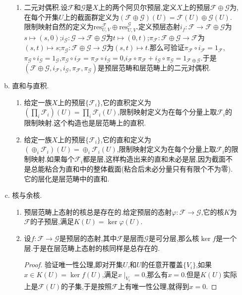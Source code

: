 \begin{enumerate}
\begin{enumerate}[(a)]
\begin{enumerate}[(1)]
			\item 二元对偶积.设$\mathscr{F}$和$\mathscr{G}$是$X$上的两个阿贝尔预层,定义$X$上的预层$\mathscr{F}\oplus\mathscr{G}$为,在每个开集$U$上的截面群定义为$(\mathscr{F}\oplus\mathscr{G})(U)=\mathscr{F}(U)\oplus\mathscr{G}(U)$.限制映射自然的定义为$\mathrm{res}_{U,V}^\mathscr{F}\oplus\mathrm{res}_{U,V}^\mathscr{G}$.定义预层态射$i_f:\mathscr{F}\to \mathscr{F}\oplus\mathscr{G}$为$s\mapsto(s,0)$;$i_{\mathscr{G}}:\mathscr{G}\to\mathscr{F}\oplus\mathscr{G}$为$t\mapsto(0,t)$;$\pi_\mathscr{F}:\mathscr{F}\oplus\mathscr{G}\to\mathscr{F}$为$(s,t)\mapsto s$;$\pi_\mathscr{G}:\mathscr{F}\oplus\mathscr{G}\to\mathscr{G}$为$(s,t)\mapsto t$.那么可验证$\pi_\mathscr{F}\circ i_\mathscr{F}=1_\mathscr{F}$,$\pi_\mathscr{G}\circ i_\mathscr{G}=1_\mathscr{G}$,$\pi_\mathscr{G}\circ i_\mathscr{F}=\pi_\mathscr{F}\circ i_\mathscr{G}=0$,$i_\mathscr{F}\circ\pi_\mathscr{F}+i_\mathscr{G}\circ\pi_\mathscr{G}=1_{\mathscr{F}\oplus\mathscr{G}}$.于是$(\mathscr{F}\oplus\mathscr{G},i_\mathscr{F},i_\mathscr{G},\pi_\mathscr{F},\pi_\mathscr{G})$是预层范畴和层范畴上的二元对偶积.
		\end{enumerate}
		\item 直和与直积.
		\begin{enumerate}[(1)]
			\item 给定一族$X$上的预层$\{\mathscr{F}_i\}$,它的直积定义为$(\prod_i\mathscr{F}_i)(U)=\prod_i\mathscr{F}_i(U)$,限制映射定义为在每个分量上取$\mathscr{F}_i$的限制映射.这个构造也是层范畴上的直积.
			\item 给定一族$X$上的预层$\{\mathscr{F}_i\}$,它的直和定义为$(\oplus_i\mathscr{F}_i)(U)=\oplus_i\mathscr{F}_i(U)$,限制映射定义为在每个分量上取$\mathscr{F}_i$的限制映射.如果每个$\mathscr{F}_i$都是层,这样构造出来的直和未必是层,因为截面不是总能粘合为直和中的整体截面(粘合后未必分量只有有限个不为零).它的层化是层范畴中的直和.
		\end{enumerate}
		\item 核与余核.
		\begin{enumerate}[(1)]
			\item 预层范畴上态射的核总是存在的.给定预层的态射$\varphi:\mathscr{F}\to\mathscr{G}$,它的核$K$为$\mathscr{F}$的子预层,满足$K(U)=\ker\varphi(U)$.
			\item 设$f:\mathscr{F}\to\mathscr{G}$是预层的态射,其中$\mathscr{F}$是层而$\mathscr{G}$是可分层,那么核$\ker f$是一个层.于是在层范畴上态射的核同样是总存在的.
			\begin{proof}
				
				验证唯一性公理,即对开集$U$,和$U$的任意开覆盖$\{V_i\}$,如果$x\in K(U)=\ker f(U)$,满足$x\mid_{V_i}=0$,那么有$x=0$.但是$K(U)$实际上是$\mathscr{F}(U)$的子集,于是按照$\mathscr{F}$上有唯一性公理,就得到$x=0$.
				

\end{proof}
\end{enumerate}
\end{enumerate}
\end{enumerate}
